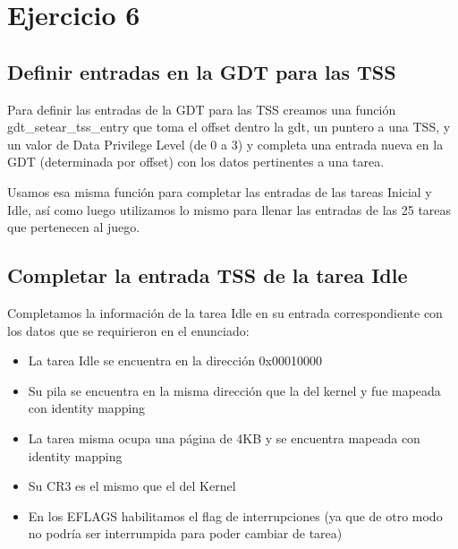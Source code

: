 \section{Ejercicio 6}

\subsection{Definir entradas en la GDT para las TSS}

Para definir las entradas de la GDT para las TSS creamos una función gdt_setear_tss_entry que toma el offset dentro la gdt, un puntero a una TSS, y un valor de Data Privilege Level (de 0 a 3) y completa una entrada nueva en la GDT (determinada por offset) con los datos pertinentes a una tarea.

Usamos esa misma función para completar las entradas de las tareas Inicial y Idle, así como luego utilizamos lo mismo para llenar las entradas de las 25 tareas que pertenecen al juego.

\subsection{Completar la entrada TSS de la tarea Idle}

Completamos la información de la tarea Idle en su entrada correspondiente con los datos que se requirieron en el enunciado:

\begin{itemize}
	\item La tarea Idle se encuentra en la dirección 0x00010000
	\item Su pila se encuentra en la misma dirección que la del kernel y fue mapeada con identity mapping
	\item La tarea misma ocupa una página de 4KB y se encuentra mapeada con identity mapping
	\item Su CR3 es el mismo que el del Kernel
	\item En los EFLAGS habilitamos el flag de interrupciones (ya que de otro modo no podría ser interrumpida para poder cambiar de tarea)
\end{itemize}
